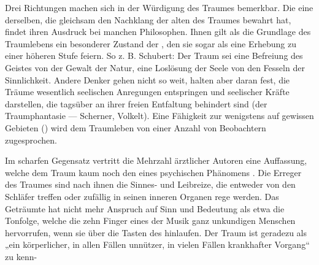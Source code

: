 \documentclass[twoside=true,titlepage=false,open=any, parskip=never, fontsize=10pt, headings=small, chapterprefix=false, appendixprefix=false]{scrbook}
\begin{document}
            
        \pstart
        Drei Richtungen machen sich in der Würdigung des Traumes bemerkbar. Die eine derselben, die gleichsam den Nachklang
               der alten  des Traumes bewahrt hat, findet ihren Ausdruck bei manchen
               Philosophen. Ihnen gilt als die Grundlage des Traumlebens ein besonderer Zustand
               der , den sie sogar als eine Erhebung zu einer höheren Stufe feiern. So 
                z. B. Schubert:
               Der Traum sei eine Befreiung des Geistes von der Gewalt der  Natur, eine Loslösung der Seele von den Fesseln der Sinnlichkeit. Andere
               Denker gehen nicht so weit, halten aber daran fest,  die Träume wesentlich seelischen Anregungen entspringen und  seelischer Kräfte darstellen, die tagsüber an ihrer freien
               Entfaltung behindert sind (der
               Traumphantasie — Scherner, Volkelt). Eine Fähigkeit zur
                wenigstens auf gewissen Gebieten () wird dem Traumleben von einer  Anzahl von Beobachtern zugesprochen.
        \pend
    
            
        \pstart
        Im scharfen Gegensatz  vertritt die Mehrzahl ärztlicher Autoren eine Auffassung, welche dem Traum kaum noch den 
                eines psychischen Phänomens . Die Erreger des Traumes sind nach ihnen  die Sinnes- und Leibreize, die entweder von  den Schläfer treffen oder zufällig in seinen inneren Organen rege werden.
               Das Geträumte hat nicht mehr Anspruch auf Sinn und Bedeutung als etwa die
               Tonfolge, welche die zehn Finger eines der Musik
               ganz unkundigen Menschen hervorrufen, wenn sie über die Tasten des  hinlaufen. Der Traum ist geradezu als „ein körperlicher, in allen Fällen
                  unnützer, in vielen Fällen krankhafter Vorgang“ zu kenn-
        \pend
    
\end{document}
